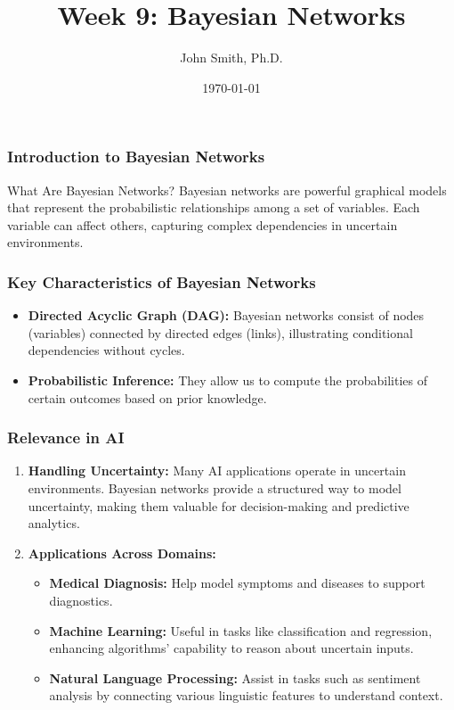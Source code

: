 \documentclass[aspectratio=169]{beamer}
\title[Week 9: Bayesian Networks]{Week 9: Bayesian Networks}
\author[J. Smith]{John Smith, Ph.D.}
\institute[University Name]{
  Department of Computer Science\\
  University Name\\
  \vspace{0.3cm}
  Email: email@university.edu\\
  Website: www.university.edu
}
\date{\today}
\begin{document}
\frame{\titlepage}

\begin{frame}[fragile]
    \frametitle{Introduction to Bayesian Networks}
    \begin{block}{What Are Bayesian Networks?}
        Bayesian networks are powerful graphical models that represent the probabilistic relationships among a set of variables. 
        Each variable can affect others, capturing complex dependencies in uncertain environments.
    \end{block}
\end{frame}

\begin{frame}[fragile]
    \frametitle{Key Characteristics of Bayesian Networks}
    \begin{itemize}
        \item \textbf{Directed Acyclic Graph (DAG):} 
        Bayesian networks consist of nodes (variables) connected by directed edges (links), illustrating conditional dependencies without cycles.
        
        \item \textbf{Probabilistic Inference:} 
        They allow us to compute the probabilities of certain outcomes based on prior knowledge.
    \end{itemize}
\end{frame}

\begin{frame}[fragile]
    \frametitle{Relevance in AI}
    \begin{enumerate}
        \item \textbf{Handling Uncertainty:} 
        Many AI applications operate in uncertain environments. Bayesian networks provide a structured way to model uncertainty, making them valuable for decision-making and predictive analytics.
        
        \item \textbf{Applications Across Domains:} 
        \begin{itemize}
            \item \textbf{Medical Diagnosis:} 
            Help model symptoms and diseases to support diagnostics.
            \item \textbf{Machine Learning:} 
            Useful in tasks like classification and regression, enhancing algorithms' capability to reason about uncertain inputs.
            \item \textbf{Natural Language Processing:} 
            Assist in tasks such as sentiment analysis by connecting various linguistic features to understand context.
        \end{itemize}
    \end{enumerate}
\end{frame}
\end{document}
